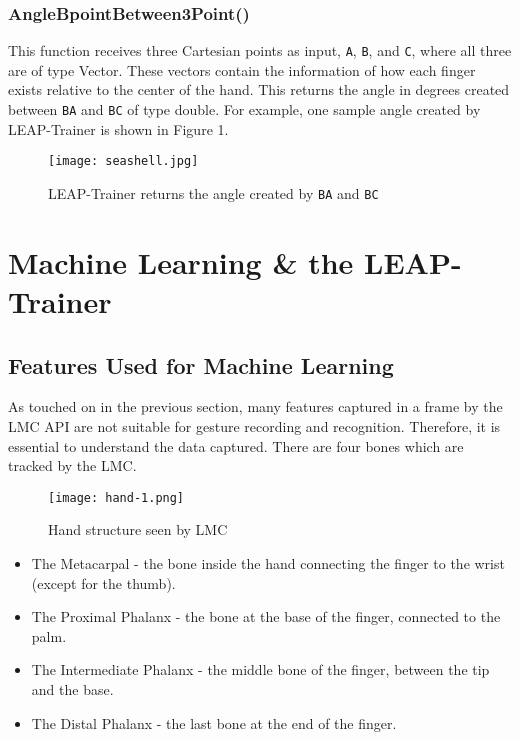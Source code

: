 \documentclass[letterpaper, 10 pt, conference]{ieeeconf}
\begin{document}
\vspace{5pt}
\subsubsection{AngleBpointBetween3Point()}
This function receives three Cartesian points as input, \texttt{A}, \texttt{B}, and \texttt{C}, where all three are of type Vector. These vectors contain the information of how each finger exists relative to the center of the hand. This returns the angle in degrees created between \texttt{BA} and \texttt{BC} of type double. For example, one sample angle created by LEAP-Trainer is shown in Figure 1.

\begin{figure}[h]
    \centering
	\texttt{[image: seashell.jpg]}
    \caption{LEAP-Trainer returns the angle created by \texttt{BA} and \texttt{BC}}
\end{figure}


\section{Machine Learning \& the LEAP-Trainer}

\subsection{Features Used for Machine Learning}

As touched on in the previous section, many features captured in a frame by the LMC API are not suitable for gesture recording and recognition. Therefore, it is essential to understand the data captured. There are four bones which are tracked by the LMC.

\begin{figure}[h]
    \centering
	\texttt{[image: hand-1.png]}
    \caption{Hand structure seen by LMC \cite{LMC}}
\end{figure}

\begin{itemize}
\item The Metacarpal - the bone inside the hand connecting the finger to the wrist (except for the thumb).
\item The Proximal Phalanx - the bone at the base of the finger, connected to the palm. 
\item The Intermediate Phalanx - the middle bone of the finger, between the tip and the base. 
\item The Distal Phalanx - the last bone at the end of the finger.
\end{itemize}
\end{document}
